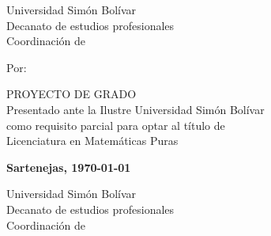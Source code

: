 

\caratulatrue
\paginatitulotrue
\resumentrue
\dedicatoriatrue
\agradecimientostrue
\listastrue
\toctrue
\introtrue
{}
\basicostrue
\mainproofstrue


\frontmatter
\ifcaratula\newpage
\bgroup
    \centering
    \thispagestyle{empty}

    \PrintUsbLogo
    {
        Universidad Simón Bolívar\\
        Decanato de estudios profesionales\\
        Coordinación de \coord
    }

    \vspace{1.5cm}

    \UppercaseBold{
        \wrapto[14cm][\centering]
        {\MainTitle}
    }

    \vspace{\fill}

    Por:
    \\
    \autor

    \vspace{\fill}

    \MakeUppercase{Proyecto de Grado}\\
    Presentado ante la Ilustre Universidad Simón Bolívar\\
    como requisito parcial para optar al título de\\
    Licenciatura en Matemáticas Puras

    \vspace{\fill}

    \textbf{Sartenejas, \today}\par
\egroup
\fi
\ifpaginatitulo\newpage
\bgroup
    \centering
    \thispagestyle{empty}

    \PrintUsbLogo
    {
        Universidad Simón Bolívar\\
        Decanato de estudios profesionales\\
        Coordinación de \coord
    }

